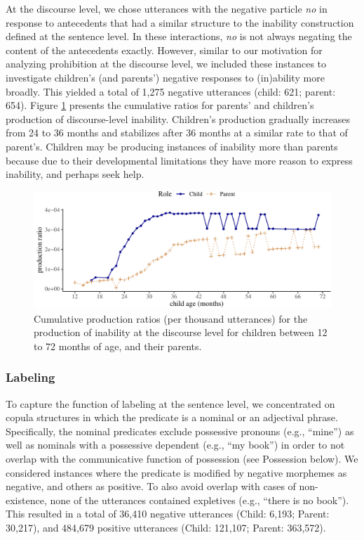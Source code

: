 \documentclass[
  man,floatsintext]{apa6}
\begin{document}
At the discourse level, we chose utterances with the negative particle \emph{no} in response to antecedents that had a similar structure to the inability construction defined at the sentence level. In these interactions, \emph{no} is not always negating the content of the antecedents exactly. However, similar to our motivation for analyzing prohibition at the discourse level, we included these instances to investigate children's (and parents') negative responses to (in)ability more broadly. This yielded a total of 1,275 negative utterances (child: 621; parent: 654). Figure \ref{fig:inabilitydiscourse} presents the cumulative ratios for parents' and children's production of discourse-level inability. Children's production gradually increases from 24 to 36 months and stabilizes after 36 months at a similar rate to that of parent's. Children may be producing instances of inability more than parents because due to their developmental limitations they have more reason to express inability, and perhaps seek help.

\begin{figure}[H]

{\centering \includegraphics{neg_construction_article_files/figure-latex/inabilitydiscourse-1} 

}

\caption{Cumulative production ratios (per thousand utterances) for the production of inability at the discourse level for children between 12 to 72 months of age, and their parents.}\label{fig:inabilitydiscourse}
\end{figure}

\hypertarget{labeling}{%
\subsubsection{Labeling}\label{labeling}}

To capture the function of labeling at the sentence level, we concentrated on copula structures in which the predicate is a nominal or an adjectival phrase. Specifically, the nominal predicates exclude possessive pronouns (e.g., ``mine'') as well as nominals with a possessive dependent (e.g., ``my book'') in order to not overlap with the communicative function of possession (see Possession below). We considered instances where the predicate is modified by negative morphemes as negative, and others as positive. To also avoid overlap with cases of non-existence, none of the utterances contained expletives (e.g., ``there is no book''). This resulted in a total of 36,410 negative utterances (Child: 6,193; Parent: 30,217), and 484,679 positive utterances (Child: 121,107; Parent: 363,572).
\end{document}

